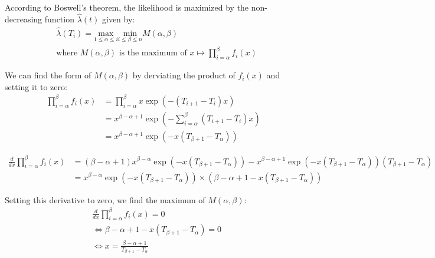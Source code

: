 \documentclass{journalstyle}
\begin{document}
According to Boswell's theorem, the likelihood is maximized by the non-decreasing function $\hat{\lambda}(t)$ given by:
\begin{equation*}
    \begin{split}
        &\hat{\lambda}(T_i) = \underset{1 \leq \alpha \leq i}{\text{max}} \underset{i \leq \beta \leq n}{\text{min}} M(\alpha, \beta) \\
        &\text{where } M(\alpha, \beta) \text{ is the maximum of } x \mapsto \prod_{i=\alpha}^{\beta} f_i(x)
    \end{split}
\end{equation*}

We can find the form of $M(\alpha, \beta)$ by derviating the product of $f_i(x)$ and setting it to zero:
\begin{equation*}
    \begin{split}
        \prod_{i=\alpha}^{\beta} f_i(x) &= \prod_{i=\alpha}^{\beta} x \exp(-(T_{i+1} - T_i) x) \\
        &= x^{\beta - \alpha + 1} \exp\left(-\sum_{i=\alpha}^{\beta} (T_{i+1} - T_i) x\right) \\
        &= x^{\beta - \alpha + 1} \exp(-x(T_{\beta + 1} - T_{\alpha}))
    \end{split}
\end{equation*}

\begin{equation*}
    \begin{split}
        \frac{d}{dx} \prod_{i=\alpha}^{\beta} f_i(x) &= (\beta - \alpha + 1) x^{\beta - \alpha} \exp(-x(T_{\beta + 1} - T_{\alpha})) - x^{\beta - \alpha + 1} \exp(-x(T_{\beta + 1} - T_{\alpha})) (T_{\beta + 1} - T_{\alpha}) \\
        &= x^{\beta - \alpha} \exp(-x(T_{\beta + 1} - T_{\alpha})) \times (\beta - \alpha + 1 - x(T_{\beta + 1} - T_{\alpha}))
    \end{split}
\end{equation*}

Setting this derivative to zero, we find the maximum of $M(\alpha, \beta)$:
\begin{equation*}
    \begin{split}
        &\frac{d}{dx} \prod_{i=\alpha}^{\beta} f_i(x) = 0 \\
        &\Leftrightarrow \beta - \alpha + 1 - x(T_{\beta + 1} - T_{\alpha}) = 0 \\
        &\Leftrightarrow x = \frac{\beta - \alpha + 1}{T_{\beta + 1} - T_{\alpha}}
    \end{split}
\end{equation*}
\end{document}
